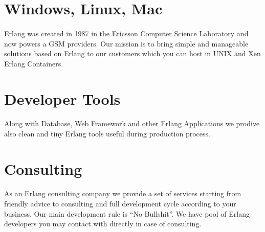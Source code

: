 \documentclass[11pt]{article}
\begin{document}
\paragraph{}
\paragraph{}

\section*{Windows, Linux, Mac}
\paragraph{}
Erlang was created in 1987 in the Ericsson Computer Science Laboratory
and now powers a GSM providers. Our mission is to bring simple and
manageable solutions based on Erlang to our customers which you can
host in UNIX and Xen Erlang Containers.

\section*{Developer Tools}
\paragraph{}
Along with Database, Web Framework and other Erlang Applications
we prodive also clean and tiny Erlang tools useful during
production process.

\section*{Consulting}
\paragraph{}
As an Erlang consulting company we provide a set of services starting from friendly advice to
consulting and full development cycle according to your business.
Our main development rule is ``No Bullshit''.
We have pool of Erlang developers you may contact with directly in case of consulting.
\end{document}

